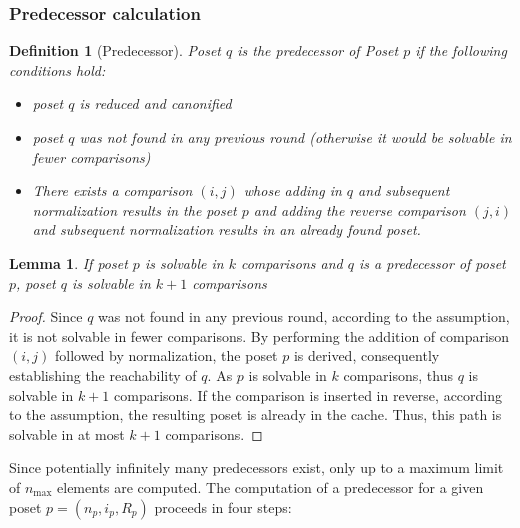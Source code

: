 \documentclass[10pt,journal,compsoc]{IEEEtran}
\newtheorem{lemma}{Lemma}
\newtheorem{definition}{Definition}
\begin{document}
\subsubsection{Predecessor calculation} \label{sec:backward:predecessor_calculation}

\begin{definition}[Predecessor] \label{definition:predecessor_calculation}
  Poset $q$ is the predecessor of Poset $p$ if the following conditions hold:
  \begin{itemize}
    \item poset $q$ is reduced and canonified
    \item poset $q$ was not found in any previous round (otherwise it would be solvable in fewer comparisons)
    \item There exists a comparison $(i, j)$ whose adding in $q$ and subsequent normalization results in the poset $p$ and adding the reverse comparison $(j, i)$ and subsequent normalization results in an already found poset.
  \end{itemize}
\end{definition}

\begin{lemma} \label{lemma:predecessor_calculation}
  If poset $p$ is solvable in $k$ comparisons and $q$ is a predecessor of poset $p$, poset $q$ is solvable in $k + 1$ comparisons
\end{lemma}

\begin{proof} \label{proof:predecessor_calculation}
  Since $q$ was not found in any previous round, according to the assumption, it is not solvable in fewer comparisons.
  By performing the addition of comparison $(i, j)$ followed by normalization, the poset $p$ is derived, consequently establishing the reachability of $q$.
  As $p$ is solvable in $k$ comparisons, thus $q$ is solvable in $k + 1$ comparisons.
  If the comparison is inserted in reverse, according to the assumption, the resulting poset is already in the cache.
  Thus, this path is solvable in at most $k + 1$ comparisons.
\end{proof}

Since potentially infinitely many predecessors exist, only up to a maximum limit of $n_{\text{max}}$ elements are computed.
The computation of a predecessor for a given poset $p = (n_p, i_p, R_p)$ proceeds in four steps:
\end{document}
